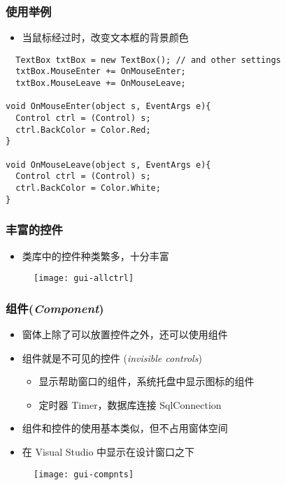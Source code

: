 \begin{frame}[fragile]
\frametitle{使用举例}
\begin{itemize}
\item 当鼠标经过时，改变文本框的背景颜色
\end{itemize}
\begin{lstlisting}
  TextBox txtBox = new TextBox(); // and other settings
  txtBox.MouseEnter += OnMouseEnter;
  txtBox.MouseLeave += OnMouseLeave;

void OnMouseEnter(object s, EventArgs e){
  Control ctrl = (Control) s;
  ctrl.BackColor = Color.Red;
}

void OnMouseLeave(object s, EventArgs e){
  Control ctrl = (Control) s;
  ctrl.BackColor = Color.White;
}

\end{lstlisting}
\end{frame}

\begin{frame}
\frametitle{丰富的控件}
\begin{itemize}
\item 类库中的控件种类繁多，十分丰富
\end{itemize}
\begin{figure}[htbp]
  \centering
  \texttt{[image: gui-allctrl]}
\end{figure}
\end{frame}

\begin{frame}
\frametitle{组件(\textit{Component})}
\begin{itemize}
\item 窗体上除了可以放置控件之外，还可以使用组件
\item 组件就是不可见的控件 (\textit{invisible controls})
\begin{itemize}
\item 显示帮助窗口的组件，系统托盘中显示图标的组件
\item 定时器 Timer，数据库连接 SqlConnection
\end{itemize}
\item 组件和控件的使用基本类似，但不占用窗体空间
\item 在 Visual Studio 中显示在设计窗口之下
\end{itemize}
\begin{figure}[htbp]
  \centering
  \texttt{[image: gui-compnts]}
\end{figure}
\end{frame}

